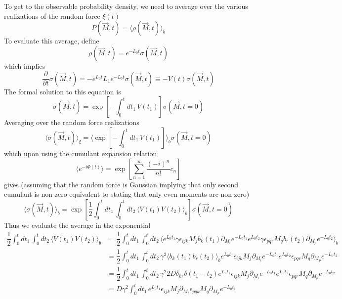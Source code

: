 \documentclass[aps,prb,onecolumn,notitlepage,showpacs,floatfix,superscriptaddress]{revtex4-1}
\begin{document}
To get to the observable probability density, we need to average over the various realizations of the random force $\xi(t)$
\begin{equation}
P(\vec{M},t) = \langle \rho(\vec{M},t)\rangle_b
\end{equation}
To evaluate this average, define
\begin{equation}
\rho(\vec{M},t) = e^{-L_0 t} \sigma(\vec{M},t)
\end{equation}
which implies
\begin{equation}
\dfrac{\partial}{\partial t}  \sigma(\vec{M},t) = - e^{L_0 t} L_1 e^{-L_0 t} \sigma(\vec{M},t) \equiv - V(t) \sigma(\vec{M},t)
\end{equation}
The formal solution to this equation is 
\begin{equation}
\sigma(\vec{M},t) = \exp\left[-\int_0^t dt_1 \, V(t_1) \right] \sigma(\vec{M},t=0)
\end{equation}
Averaging over the random force realizations
\begin{equation}
\langle \sigma(\vec{M},t) \rangle_\xi = \langle \exp\left[-\int_0^t dt_1 \, V(t_1) \right] \rangle_b  \sigma(\vec{M},t=0)
\end{equation}
which upon using the cumulant expansion relation 
\begin{equation}
\langle e^{-i \Phi(t)} \rangle = \exp \left[ \sum_{n=1}^{\infty} \dfrac{(-i )^n}{n!} c_n \right]
\end{equation}
gives (assuming that the random force is Gaussian implying that only second cumulant is non-zero equivalent to stating that only even moments are non-zero)
\begin{equation}
\langle \sigma(\vec{M},t) \rangle_b = \exp\left[\dfrac{1}{2}\int_0^t dt_1 \, \int_0^t dt_2 \, \langle V(t_1) V(t_2)\rangle_b \right]   \sigma(\vec{M},t=0)
\end{equation}
Thus we evaluate the average in the exponential
\begin{equation}
\begin{split}
\dfrac{1}{2}\int_0^t dt_1 \, \int_0^t dt_2 \, \langle V(t_1) V(t_2)\rangle_b &= \dfrac{1}{2}\int_0^t dt_1 \, \int_0^t dt_2 \, \langle e^{L_0 t_1}  \gamma \epsilon_{ijk} M_j b_k(t_1) \partial_{M_i} e^{-L_0 t_1} e^{L_0 t_2} \gamma \epsilon_{pqr} M_q b_r(t_2) \partial_{M_p} e^{-L_0 t_2}\rangle_b \\
&= \dfrac{1}{2}\int_0^t dt_1 \, \int_0^t dt_2 \, \gamma^2 \langle b_k(t_1) b_r(t_2) \rangle_b e^{L_0 t_1}   \epsilon_{ijk} M_j  \partial_{M_i} e^{-L_0 t_1} e^{L_0 t_2} \epsilon_{pqr}  M_q \partial_{M_p} e^{-L_0 t_2} \\
&= \dfrac{1}{2}\int_0^t dt_1 \, \int_0^t dt_2 \, \gamma^2 2 D \delta_{kr} \delta(t_1-t_2) e^{L_0 t_1}   \epsilon_{ijk} M_j  \partial_{M_i} e^{-L_0 t_1} e^{L_0 t_2}  \epsilon_{pqr}  M_q \partial_{M_p} e^{-L_0 t_2} \\
&= D \gamma^2 \int_0^t dt_1 \, e^{L_0 t_1}   \epsilon_{ijk} M_j  \partial_{M_i} \epsilon_{pqk}  M_q \partial_{M_p} e^{-L_0 t_1} \\
\end{split}
\end{equation}
\end{document}
